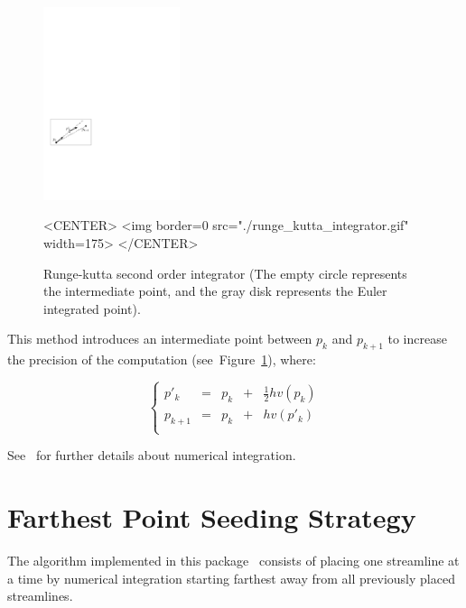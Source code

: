\begin{figure}[h!]
\begin{ccTexOnly}
\begin{center}
\includegraphics[width=4cm]{Stream_lines_2/runge_kutta_integrator}
\end{center}
\end{ccTexOnly}
\caption{Runge-kutta second order integrator (The empty circle represents the intermediate point, and the gray disk represents the Euler integrated point).
\label{runge_kutta_fig}}
\begin{ccHtmlOnly}
<CENTER>
<img border=0 src="./runge_kutta_integrator.gif" width=175>
</CENTER>
\end{ccHtmlOnly}
\end{figure}

This method introduces an intermediate point  between $p_k$ and $p_{k+1}$ to increase the
precision of the computation (see~Figure~\ref{runge_kutta_fig}), where:

$$
\left\{ \begin{array}{ccccc}
    p'_k    & = & p_k & + & \frac{1}{2}hv(p_k) \\
    p_{k+1} & = & p_k & + & hv(p'_k)        \\
   \end{array}
\right.
$$

See~\cite{cgal:ptvf-nrcpp-02} for further details about numerical
integration.

\section{Farthest Point Seeding Strategy}
\label{Section_2D_Streamlines_Strategy}

The algorithm implemented in this package~\cite{cgal:mad-fpsep-05}
consists of placing one streamline at a time by numerical integration
starting farthest away from all previously placed
streamlines.\\

